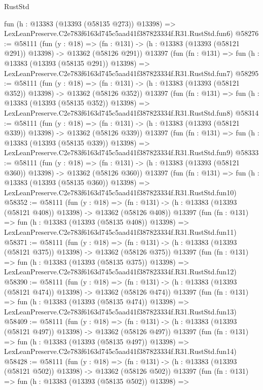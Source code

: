 \begin{lexlean}{RustStd}
\begin{coremodule}
    fun (h : @13383 (@13393 (@58135 @273)) @13398) =>
    LexLeanPreserve.C2e783f6163d745c5aad41f387823334f.R31.RustStd.fun6)
@58276 := @58111
    (fun (y : @18) =>
    (fn : @131) -> (h : @13383 (@13393 (@58121 @291)) @13398) -> @13362 (@58126 @291))
    @13397
    (fun (fn : @131) =>
    fun (h : @13383 (@13393 (@58135 @291)) @13398) =>
    LexLeanPreserve.C2e783f6163d745c5aad41f387823334f.R31.RustStd.fun7)
@58295 := @58111
    (fun (y : @18) =>
    (fn : @131) -> (h : @13383 (@13393 (@58121 @352)) @13398) -> @13362 (@58126 @352))
    @13397
    (fun (fn : @131) =>
    fun (h : @13383 (@13393 (@58135 @352)) @13398) =>
    LexLeanPreserve.C2e783f6163d745c5aad41f387823334f.R31.RustStd.fun8)
@58314 := @58111
    (fun (y : @18) =>
    (fn : @131) -> (h : @13383 (@13393 (@58121 @339)) @13398) -> @13362 (@58126 @339))
    @13397
    (fun (fn : @131) =>
    fun (h : @13383 (@13393 (@58135 @339)) @13398) =>
    LexLeanPreserve.C2e783f6163d745c5aad41f387823334f.R31.RustStd.fun9)
@58333 := @58111
    (fun (y : @18) =>
    (fn : @131) -> (h : @13383 (@13393 (@58121 @360)) @13398) -> @13362 (@58126 @360))
    @13397
    (fun (fn : @131) =>
    fun (h : @13383 (@13393 (@58135 @360)) @13398) =>
    LexLeanPreserve.C2e783f6163d745c5aad41f387823334f.R31.RustStd.fun10)
@58352 := @58111
    (fun (y : @18) =>
    (fn : @131) -> (h : @13383 (@13393 (@58121 @408)) @13398) -> @13362 (@58126 @408))
    @13397
    (fun (fn : @131) =>
    fun (h : @13383 (@13393 (@58135 @408)) @13398) =>
    LexLeanPreserve.C2e783f6163d745c5aad41f387823334f.R31.RustStd.fun11)
@58371 := @58111
    (fun (y : @18) =>
    (fn : @131) -> (h : @13383 (@13393 (@58121 @375)) @13398) -> @13362 (@58126 @375))
    @13397
    (fun (fn : @131) =>
    fun (h : @13383 (@13393 (@58135 @375)) @13398) =>
    LexLeanPreserve.C2e783f6163d745c5aad41f387823334f.R31.RustStd.fun12)
@58390 := @58111
    (fun (y : @18) =>
    (fn : @131) -> (h : @13383 (@13393 (@58121 @474)) @13398) -> @13362 (@58126 @474))
    @13397
    (fun (fn : @131) =>
    fun (h : @13383 (@13393 (@58135 @474)) @13398) =>
    LexLeanPreserve.C2e783f6163d745c5aad41f387823334f.R31.RustStd.fun13)
@58409 := @58111
    (fun (y : @18) =>
    (fn : @131) -> (h : @13383 (@13393 (@58121 @497)) @13398) -> @13362 (@58126 @497))
    @13397
    (fun (fn : @131) =>
    fun (h : @13383 (@13393 (@58135 @497)) @13398) =>
    LexLeanPreserve.C2e783f6163d745c5aad41f387823334f.R31.RustStd.fun14)
@58428 := @58111
    (fun (y : @18) =>
    (fn : @131) -> (h : @13383 (@13393 (@58121 @502)) @13398) -> @13362 (@58126 @502))
    @13397
    (fun (fn : @131) =>
    fun (h : @13383 (@13393 (@58135 @502)) @13398) =>

\end{coremodule}
\end{lexlean}
